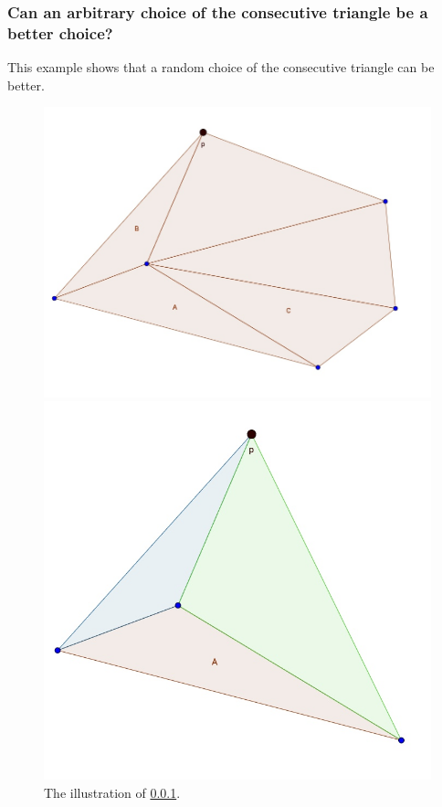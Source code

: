 \documentclass[10pt]{article}
\begin{document}
\subsubsection{Can an arbitrary choice of the consecutive triangle be a better choice?}\label{Question}
	This example shows that a random choice of the consecutive triangle can be better. 
	\begin{figure}[h]\label{Example}
			\begin{minipage}{0.3\textwidth}
				\includegraphics[scale=0.2]{../Figures/Example.jpg}
			\end{minipage}
			\hfill
			\begin{minipage}{0.4\textwidth}
				\includegraphics[scale=0.2]{../Figures/Calculation.jpg}
			\end{minipage}
		\caption{The illustration of \ref{Question}.}
			
			
	\end{figure}
\end{document}
